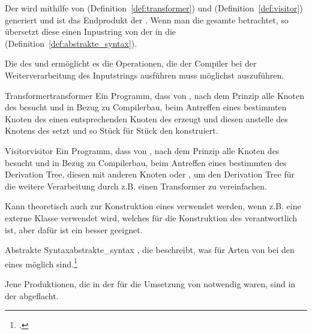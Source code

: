 
Der  wird mithilfe von  (Definition~\ref{def:transformer}) und  (Definition~\ref{def:visitor}) generiert und ist das Endprodukt der . Wenn man die gesamte  betrachtet, so übersetzt diese einen Inpustring von der  in die  (Definition~\ref{def:abstrakte_syntax}).

Die  des  und   ermöglicht es die Operationen, die der Compiler bei der Weiterverarbeitung des Inputstrings ausführen muss möglichst  auszuführen.

\begin{Definition}{Transformer}{transformer}
Ein Programm, dass von , nach dem  Prinzip alle Knoten des  besucht und in Bezug zu Compilerbau, beim Antreffen eines bestimmten Knoten des  einen entsprechenden Knoten des  erzeugt und diesen anstelle des Knotens des  setzt und so Stück für Stück den  konstruiert.
\end{Definition}

\begin{Definition}{Visitor}{visitor}
Ein Programm, dass von , nach dem  Prinzip alle Knoten des  besucht und in Bezug zu Compilerbau, beim Antreffen eines bestimmten  des Derivation Tree, diesen  mit anderen Knoten  oder , um den Derivation Tree für die weitere Verarbeitung durch z.B. einen Transformer zu vereinfachen.

Kann theoretisch auch zur Konstruktion eines  verwendet werden, wenn z.B. eine externe Klasse verwendet wird, welches für die Konstruktion des  verantwortlich ist, aber dafür ist ein  besser geeignet.
\end{Definition}

\begin{Definition}{Abstrakte Syntax}{abstrakte_syntax}
  , die beschreibt, was für Arten von  bei den  eines  möglich sind.\footcite{noauthor_course_2022}

  Jene Produktionen, die in der  für die Umsetzung von  notwendig waren, sind in der  abgeflacht.
\end{Definition}

